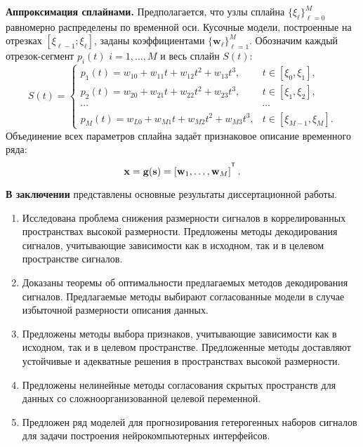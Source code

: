 \documentclass[11pt, a5paper]{dissert}
\begin{document}
\textbf{Аппроксимация сплайнами.}
Предполагается, что узлы сплайна $\{\xi_\ell\}_{\ell=0}^M$ равномерно распределены по временной оси.
Кусочные модели, построенные на отрезках $[\xi_{\ell-1}; \xi_{\ell}]$, заданы коэффициентами $\{\mathbf{w}_\ell\}_{\ell=1}^{M}$.
Обозначим каждый отрезок-сегмент $p_i(t)$ $i = 1, \dots, M$ и весь сплайн $S(t)$:
\begin{equation*}
	S(t) = \begin{cases}
		p_1(t) = w_{10} +w_{11}t + w_{12}t^2 + w_{13}t^3, & t\in [\xi_0, \xi_1],\\
		p_2(t) = w_{20} +w_{21}t + w_{22}t^2 + w_{23}t^3, & t\in [\xi_1, \xi_2],\\
		\cdots&\cdots \\
		p_{M}(t) = w_{L0} +w_{M1}t + w_{M2}t^2 + w_{M3}t^3, & t\in [\xi_{M-1}, \xi_M].					
	\end{cases}
\end{equation*}
Объединение всех параметров сплайна задаёт признаковое описание временного ряда:
\[
	\bx = \mathbf{g}(\bs) = \left[\mathbf{w}_1, \dots, \mathbf{w}_{M}\right]^{\T}.
\]

\textbf{В заключении} представлены основные результаты диссертационной работы.

\begin{enumerate}
	\item Исследована проблема снижения размерности сигналов в коррелированных пространствах высокой размерности. 
	Предложены методы декодирования сигналов, учитывающие зависимости как в исходном, так и в целевом пространстве сигналов.
	\item Доказаны теоремы об оптимальности предлагаемых методов декодирования сигналов. Предлагаемые методы выбирают согласованные модели в случае избыточной размерности описания данных.
	\item Предложены методы выбора признаков, учитывающие зависимости как в исходном, так и в целевом пространстве. Предложенные методы доставляют устойчивые и адекватные решения в пространствах высокой размерности.
	\item Предложены нелинейные методы согласования скрытых пространств для данных со сложноорганизованной целевой переменной.
	\item Предложен ряд моделей для прогнозирования гетерогенных наборов сигналов для задачи построения нейрокомпьютерных интерфейсов.
\end{enumerate}
\end{document}
